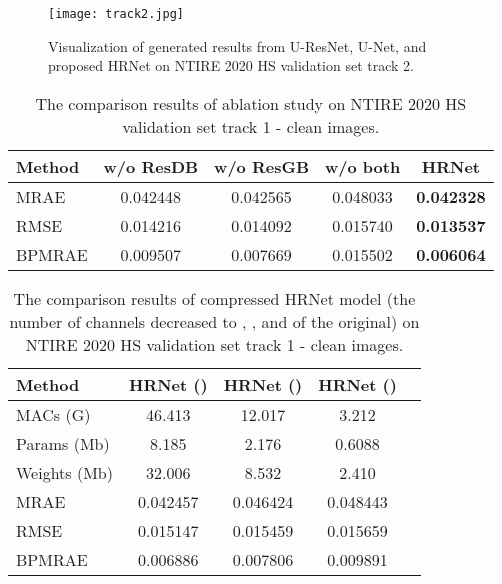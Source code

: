 \documentclass[10pt,twocolumn,letterpaper]{article}
\begin{document}
\begin{figure*}[t]
\centering
\texttt{[image: track2.jpg]}
\caption{Visualization of generated results from U-ResNet, U-Net, and proposed HRNet on NTIRE 2020 HS validation set track 2.}
\label{v2}
\end{figure*}

\begin{table}[t]
\begin{center}
\begin{tabular}{lcccc}
\hline
Method & w/o ResDB & w/o ResGB & w/o both & HRNet \\
\hline
\hline
MRAE & 0.042448 & 0.042565 & 0.048033 & \textbf{0.042328} \\
RMSE & 0.014216 & 0.014092 & 0.015740 & \textbf{0.013537} \\
BPMRAE & 0.009507 & 0.007669 & 0.015502 & \textbf{0.006064} \\
\hline
\end{tabular}
\end{center}
\caption{The comparison results of ablation study on NTIRE 2020 HS validation set track 1 - clean images.}
\label{ablation}
\end{table}

\begin{table}[t]
\begin{center}
\begin{tabular}{lcccc}
\hline
Method & HRNet () & HRNet () & HRNet () \\
\hline
\hline
MACs (G) & 46.413 & 12.017 & 3.212 \\
Params (Mb) & 8.185 & 2.176 & 0.6088 \\
Weights (Mb) & 32.006 & 8.532 & 2.410 \\
MRAE & 0.042457 & 0.046424 & 0.048443 \\
RMSE & 0.015147 & 0.015459 & 0.015659 \\
BPMRAE & 0.006886 & 0.007806 & 0.009891 \\
\hline
\end{tabular}
\end{center}
\caption{The comparison results of compressed HRNet model (the number of channels decreased to , , and  of the original) on NTIRE 2020 HS validation set track 1 - clean images.}
\label{para}
\end{table}
\end{document}
